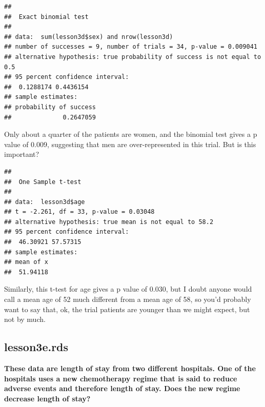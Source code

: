 \documentclass[]{book}
\newenvironment{Shaded}{\begin{snugshade}}{\end{snugshade}}
\newcommand{\DataTypeTok}[1]{\textcolor[rgb]{0.13,0.29,0.53}{#1}}
\newcommand{\FloatTok}[1]{\textcolor[rgb]{0.00,0.00,0.81}{#1}}
\newcommand{\KeywordTok}[1]{\textcolor[rgb]{0.13,0.29,0.53}{\textbf{#1}}}
\newcommand{\NormalTok}[1]{#1}
\newcommand{\OperatorTok}[1]{\textcolor[rgb]{0.81,0.36,0.00}{\textbf{#1}}}
\begin{document}
\begin{Shaded}
\end{Shaded}

\begin{verbatim}
## 
##  Exact binomial test
## 
## data:  sum(lesson3d$sex) and nrow(lesson3d)
## number of successes = 9, number of trials = 34, p-value = 0.009041
## alternative hypothesis: true probability of success is not equal to 0.5
## 95 percent confidence interval:
##  0.1288174 0.4436154
## sample estimates:
## probability of success 
##              0.2647059
\end{verbatim}

Only about a quarter of the patients are women, and the binomial test gives a p value of 0.009, suggesting that men are over-represented in this trial. But is this important?

\begin{Shaded}
\end{Shaded}

\begin{verbatim}
## 
##  One Sample t-test
## 
## data:  lesson3d$age
## t = -2.261, df = 33, p-value = 0.03048
## alternative hypothesis: true mean is not equal to 58.2
## 95 percent confidence interval:
##  46.30921 57.57315
## sample estimates:
## mean of x 
##  51.94118
\end{verbatim}

Similarly, this t-test for age gives a p value of 0.030, but I doubt anyone would call a mean age of 52 much different from a mean age of 58, so you'd probably want to say that, ok, the trial patients are younger than we might expect, but not by much.

\hypertarget{lesson3e.rds}{%
\subsection{lesson3e.rds}\label{lesson3e.rds}}

\textbf{These data are length of stay from two different hospitals. One of the hospitals uses a new chemotherapy regime that is said to reduce adverse events and therefore length of stay. Does the new regime decrease length of stay?}
\end{document}
